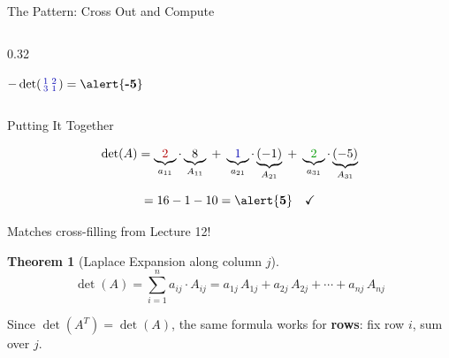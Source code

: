 \documentclass[10pt]{beamer}
\theoremstyle{definition}
\newtheorem{thm}{Theorem}[section]
\newcommand{\x}[1]{\alert{\textbf{#1}}}
\newcommand{\rd}[1]{{\color{red!70!black}#1}}
\newcommand{\bl}[1]{{\color{blue!70!black}#1}}
\newcommand{\gn}[1]{{\color{green!60!black}#1}}
\begin{document}
\begin{frame}[fragile]{The Pattern: Cross Out and Compute}
\begin{columns}[T]
\begin{column}{0.32\textwidth}
\begin{center}
$-\det\!\left(\begin{smallmatrix}\bl{1}&\bl{2}\\\bl{3}&\bl{1}\end{smallmatrix}\right) = \x{-5}$
\end{center}
\end{column}
\end{columns}

\end{frame}


\begin{frame}{Putting It Together}

$$
\det(A) = \underbrace{\rd{2}}_{a_{11}} \cdot \underbrace{8}_{A_{11}}
\;+\; \underbrace{\bl{1}}_{a_{21}} \cdot \underbrace{({-}1)}_{A_{21}}
\;+\; \underbrace{\gn{2}}_{a_{31}} \cdot \underbrace{({-}5)}_{A_{31}}
$$

$$
= 16 - 1 - 10 = \x{5} \quad \checkmark
$$

\vfill

Matches cross-filling from Lecture 12!

\vfill

\begin{thm}[Laplace Expansion along column $j$]
$$
\boxed{\det(A) = \sum_{i=1}^{n} a_{ij} \cdot A_{ij} = a_{1j}\,A_{1j} + a_{2j}\,A_{2j} + \cdots + a_{nj}\,A_{nj}}
$$
\end{thm}

Since $\det(A^T) = \det(A)$, the same formula works for \x{rows}: fix row $i$, sum over $j$.

\end{frame}
\end{document}
